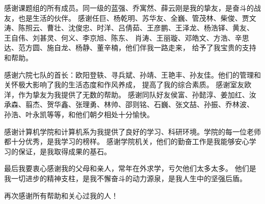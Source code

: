 \begin{ack}
感谢课题组的所有成员。同一级的蓝强、乔寓然、薛云刚是我的挚友，是奋斗的战友，也是生活的伙伴。
感谢任巨、杨乾明、苏华友、全巍、管茂林、柴俊、贾文涛、陈照云、曹壮、沈俊忠、时洋、吕倩茹、王彦鹏、王泽龙、杨浩铎、黄友、
王自伟、刘甚灵、何义、李京旭、陈东、
肖涛、王丽璇、邓皓文、方浩、辛思达、范方圆、施自龙、杨静、董辛楠，他们伴我一路走来，
给予了我宝贵的支持和帮助。

感谢六院七队的首长：欧阳登轶、寻兵斌、孙靖、王艳丰、孙友佳。他们的管理和关怀极大影响了我的生活态度和作风养成，
提高了我的综合素质。
感谢室友欧洋，作为挚友为我提供了无数的帮助。
感谢同队好友侯富、孙懿淳、姜加红、汝承森、翦杰、贺华鑫、张理勇、林帅、邵则铭、石巍、张文喆、孙振、乔林波、
孙浩、叶永凯等等，和他们朝夕相处十分愉快。

感谢计算机学院和计算机系为我提供了良好的学习、科研环境。学院的每一位老师都十分优秀，是我学习的榜样。
感谢学院机关，他们的勤奋工作是我能够安心学习的保证，是我取得成果的基石。

最后我要衷心感谢我的父母和亲人，常年在外求学，亏欠他们太多太多。
他们是我一切进步的精神支柱，是我不懈奋斗的动力源泉，是我人生中的坚强后盾。

再次感谢所有帮助和关心过我的人！




\end{ack}
